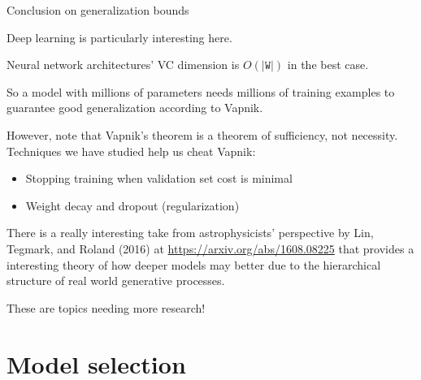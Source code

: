 \documentclass{beamer}
\newcommand{\mat}[1]{\mathtt{#1}}
\begin{document}
\begin{frame}{Conclusion on generalization bounds}

  Deep learning is particularly interesting here.

  \medskip

  Neural network architectures' VC dimension is $O(|\mat{W}|)$ in the best
  case.

  \medskip

  So a model with millions of parameters needs millions of training
  examples to \alert{guarantee} good generalization according to
  Vapnik.

  \medskip

  However, note that Vapnik's theorem is a theorem of
  \alert{sufficiency}, not necessity. Techniques we have studied help
  us cheat Vapnik:
  \begin{itemize}
  \item Stopping training when validation set cost is minimal
  \item Weight decay and dropout (regularization)
  \end{itemize}

  \medskip

  There is a really interesting take from astrophysicists' perspective
  by Lin, Tegmark, and Roland (2016) at
  \url{https://arxiv.org/abs/1608.08225} that provides a interesting
  theory of how deeper models may better due to the hierarchical
  structure of real world generative processes.

  \medskip
  
  These are topics needing more research!
  
\end{frame}

\section{Model selection}
\end{document}
